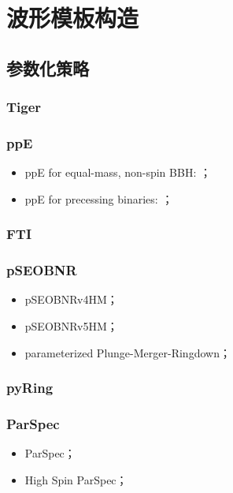 \documentclass[CJK]{paper}  %
\begin{document}
\newpage
\section{波形模板构造}

\subsection{参数化策略}
\subsubsection{Tiger}
\par \cite{TIGER_towards}\cite{TIGER_towards_further}\cite{TIGER}

\subsubsection{ppE}
\begin{itemize}
	\item[1. ] ppE for equal-mass, non-spin BBH: \cite{ppE}；
	\item[2. ] ppE for precessing binaries: \cite{ppE_precessing}；
\end{itemize}

\subsubsection{FTI}
\par \cite{FTI}

\subsubsection{pSEOBNR}
\begin{itemize}
	\item[1. ] pSEOBNRv4HM\cite{pSEOBNRv4HM}；
	\item[2. ] pSEOBNRv5HM\cite{pSEOBNRv5HM}；
	\item[3. ] parameterized Plunge-Merger-Ringdown\cite{pPMR}；
\end{itemize}

\subsubsection{pyRing}


\subsubsection{ParSpec}
\begin{itemize}
	\item[1. ] ParSpec\cite{ParSpec}；
	\item[2. ] High Spin ParSpec\cite{ParSpec_high_spin}；
\end{itemize}
\end{document}
